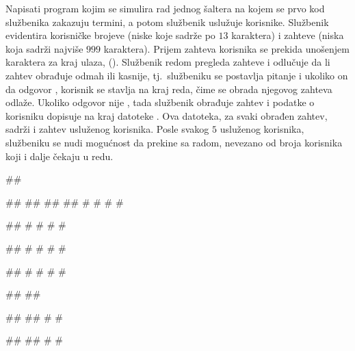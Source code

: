 \begin{Exercise}[label=606]
Napisati program kojim se simulira rad jednog šaltera na kojem se prvo kod službenika zakazuju 
termini, a potom službenik uslužuje korisnike. 
Službenik evidentira korisničke  brojeve (niske koje sadrže po $13$ karaktera) i zahteve (niska koja sadrži najviše $999$ karaktera). 
Prijem zahteva korisnika se prekida unošenjem karaktera za kraj ulaza, ().
Službenik redom pregleda zahteve i odlučuje da li zahtev obrađuje odmah ili kasnije, tj.~službeniku se postavlja pitanje 
 i ukoliko on da odgovor , 
korisnik se stavlja na kraj reda, čime se obrada njegovog zahteva odlaže. Ukoliko odgovor nije , tada službenik obrađuje zahtev i podatke o korisniku dopisuje na kraj datoteke . Ova datoteka, za svaki obrađen zahtev, sadrži  i zahtev usluženog korisnika.
Posle svakog $5$ usluženog korisnika, službeniku se nudi mogućnost da prekine sa radom, nevezano od broja korisnika koji i dalje čekaju u redu. 

\begin{maxitest}
\begin{upotreba}{1}
##

#\naslovInt#
## 
##
##
# #
# #

##
# #
# #

##
# #
# #

##
# #
# #

##
##

##
##
# #

##
##
# #


\end{upotreba}
\end{maxitest}
\end{Exercise}
